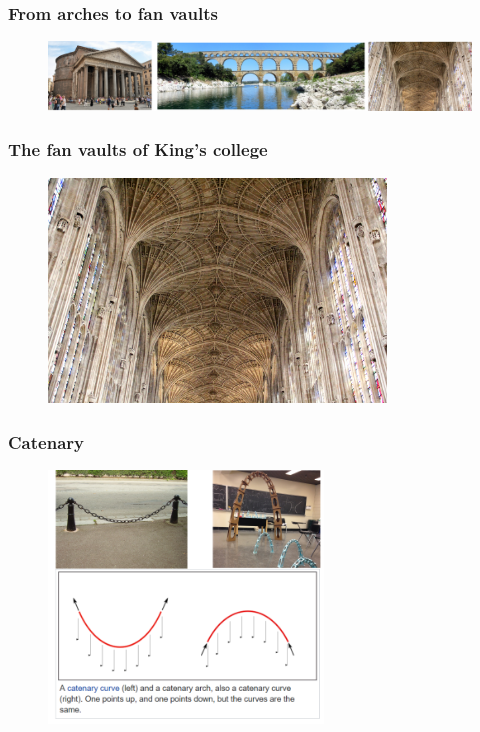 \documentclass[notes]{beamer}
\begin{document}
\begin{frame}
	\frametitle{From arches to fan vaults}
	\begin{figure}[ht]
		\centering
		\includegraphics[width=\textwidth]{figs/arches-fan-vaults.png}
	\end{figure}
\end{frame}

\begin{frame}
	\frametitle{The fan vaults of King's college}
	\begin{figure}[ht]
		\centering
		\includegraphics[width=0.8\textwidth]{figs/fanvaults.jpg}
	\end{figure}
\end{frame}


\begin{frame}
	\frametitle{Catenary}
	\begin{figure}[ht]
		\centering
		\includegraphics[width=0.65\textwidth]{figs/catenary.png}
	\end{figure}
\end{frame}
\end{document}
